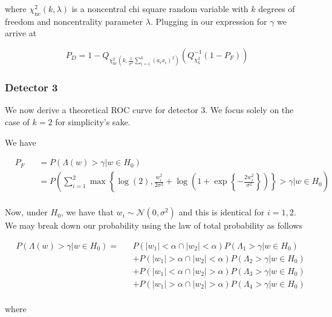 \documentclass[english]{article}
\begin{document}
where $\chi_{\text{nc}}^2\left(k,\lambda\right)$ is a noncentral chi square random variable with $k$ degrees of freedom and noncentrality parameter $\lambda$. Plugging in our expression for $\gamma$ we arrive at

\begin{equation}
P_D = 1-Q_{\chi_{\text{nc}}^2\left(k, \frac{1}{\sigma^2}\sum_{i=1}^k\left(a_ix_i\right)^2\right)}\left(Q^{-1}_{\chi^2_k}\left(1-P_F\right)\right)
\end{equation}

\subsubsection{Detector 3}
We now derive a theoretical ROC curve for detector 3. We focus solely on the case of $k=2$ for simplicity's sake.

We have

\begin{equation}
\begin{aligned}
&P_F
&&= P\left(\Lambda(w)>\gamma|w\in H_0\right)\\
&&&=P\left(\sum_{i=1}^2\max\left\{\log\left(2\right), \frac{w_i^2}{2\sigma^2}+\log\left(1 + \exp\left\{-\frac{2w_i^2}{\sigma^2}\right\}\right)\right\} > \gamma |w\in H_0\right)\\
\end{aligned}
\end{equation}

Now, under $H_0$, we have that $w_i\sim\mathcal{N}(0,\sigma^2)$ and this is identical for $i=1,2$. We may break down our probability using the law of total probability as follows

\begin{equation}
\begin{aligned}
&P(\Lambda(w)>\gamma|w\in H_0) =
&&P(|w_1|<\alpha \cap |w_2| <\alpha)P(\Lambda_1 >\gamma|w\in H_0) \\
&&&+P(|w_1|>\alpha \cap |w_2| <\alpha)P(\Lambda_2 >\gamma|w\in H_0) \\
&&&+P(|w_1|<\alpha \cap |w_2| >\alpha)P(\Lambda_3 >\gamma|w\in H_0) \\
&&&+P(|w_1|>\alpha \cap |w_2| >\alpha)P(\Lambda_4 >\gamma|w\in H_0) \\
\end{aligned}
\end{equation}

where
\end{document}
